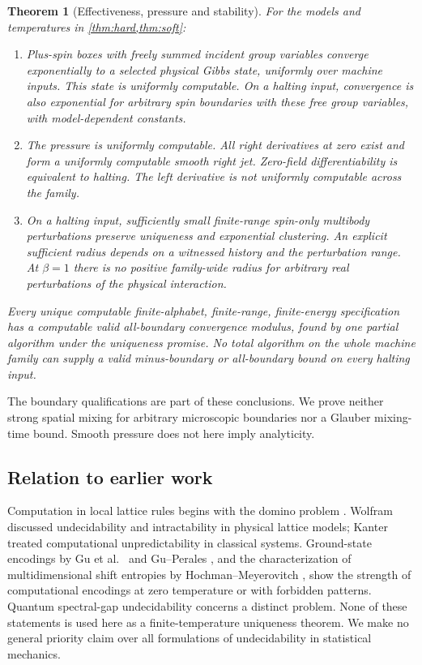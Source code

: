 \documentclass[11pt,reqno]{amsart}
\numberwithin{equation}{section}
\newtheorem{theorem}{Theorem}[section]
\theoremstyle{definition}
\theoremstyle{remark}
\begin{document}
\begin{theorem}[Effectiveness, pressure and stability]\label{thm:consequences}
For the models and temperatures in \cref{thm:hard,thm:soft}:
\begin{enumerate}
\item Plus-spin boxes with freely summed incident group variables converge exponentially to a selected physical Gibbs state, uniformly over machine inputs. This state is uniformly computable. On a halting input, convergence is also exponential for arbitrary spin boundaries with these free group variables, with model-dependent constants.
\item The pressure is uniformly computable. All right derivatives at zero exist and form a uniformly computable smooth right jet. Zero-field differentiability is equivalent to halting. The left derivative is not uniformly computable across the family.
\item On a halting input, sufficiently small finite-range spin-only multibody perturbations preserve uniqueness and exponential clustering. An explicit sufficient radius depends on a witnessed history and the perturbation range. At $\beta=1$ there is no positive family-wide radius for arbitrary real perturbations of the physical interaction.
\end{enumerate}
Every unique computable finite-alphabet, finite-range, finite-energy specification has a computable valid all-boundary convergence modulus, found by one partial algorithm under the uniqueness promise. No total algorithm on the whole machine family can supply a valid minus-boundary or all-boundary bound on every halting input.
\end{theorem}

The boundary qualifications are part of these conclusions. We prove neither strong spatial mixing for arbitrary microscopic boundaries nor a Glauber mixing-time bound. Smooth pressure does not here imply analyticity.

\subsection{Relation to earlier work}
Computation in local lattice rules begins with the domino problem \cite{Berger1966}. Wolfram \cite{Wolfram1985} discussed undecidability and intractability in physical lattice models; Kanter \cite{Kanter1990} treated computational unpredictability in classical systems. Ground-state encodings by Gu et al.\ \cite{GuWeedbrookPeralesNielsen2009} and Gu--Perales \cite{GuPerales2012}, and the characterization of multidimensional shift entropies by Hochman--Meyerovitch \cite{HochmanMeyerovitch2010}, show the strength of computational encodings at zero temperature or with forbidden patterns. Quantum spectral-gap undecidability \cite{CubittPerezGarciaWolf2022} concerns a distinct problem. None of these statements is used here as a finite-temperature uniqueness theorem. We make no general priority claim over all formulations of undecidability in statistical mechanics.
\end{document}
